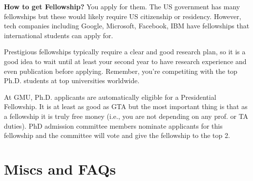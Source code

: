 \documentclass[10pt]{article}
\begin{document}
\textbf{How to get Fellowship?} You apply for them.  The US government has many fellowships but these would likely require US citizenship or residency.  However, tech companies including Google, Microsoft, Facebook, IBM have fellowships that international students can apply for. 

Prestigious fellowships typically require a clear and good research plan, so it is a good idea to wait until at least your second year to have research experience and even publication before applying. Remember, you're competiting with the top Ph.D. students at top universities worldwide. 


\begin{tcolorbox}[left=1pt,right=1pt,top=1pt,bottom=1pt]
At GMU, Ph.D. applicants are automatically eligible for a Presidential Fellowship.  It is at least as good as GTA but the most important thing is that as a fellowship it is truly free money (i.e., you are not depending on any prof. or TA duties).  PhD admission committee members nominate applicants for this fellowship and the committee will vote and give the fellowship to the top 2.
\end{tcolorbox}


\section{Miscs and FAQs}
\end{document}
